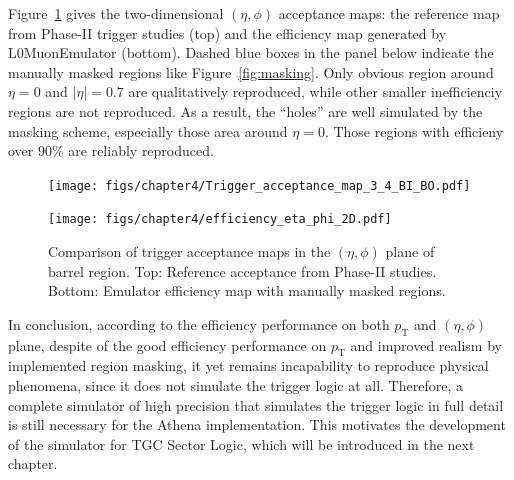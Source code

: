Figure~\ref{fig:eta_phi_comparison} gives the two-dimensional $(\eta, \phi)$ acceptance maps: the reference map from Phase-II trigger studies (top) and the efficiency map generated by L0MuonEmulator (bottom). Dashed blue boxes in the panel below indicate the manually masked regions like Figure~\ref{fig:masking}. Only obvious region around $\eta = 0$ and $|\eta| = 0.7$ are qualitatively reproduced, while other smaller inefficienciy regions are not reproduced. As a result, the ``holes'' are well simulated by the masking scheme, especially those area around $\eta = 0$. Those regions with efficieny over 90\% are reliably reproduced.

\begin{figure}[htbp]
  \centering
  \texttt{[image: figs/chapter4/Trigger\_acceptance\_map\_3\_4\_BI\_BO.pdf]}
  \vspace{0.5em}
  
  \texttt{[image: figs/chapter4/efficiency\_eta\_phi\_2D.pdf]}
  
  \caption{Comparison of trigger acceptance maps in the $(\eta, \phi)$ plane of barrel region. Top: Reference acceptance from Phase-II studies. Bottom: Emulator efficiency map with manually masked regions.}
  \label{fig:eta_phi_comparison}
\end{figure}

In conclusion, according to the efficiency performance on both $p_\mathrm{T}$ and $(\eta, \phi)$ plane, despite of the good efficiency performance on $p_\mathrm{T}$ and improved realism by implemented region masking, it yet remains incapability to reproduce physical phenomena, since it does not simulate the trigger logic at all. Therefore, a complete simulator of high precision that simulates the trigger logic in full detail is still necessary for the Athena implementation. This motivates the development of the simulator for TGC Sector Logic, which will be introduced in the next chapter.
